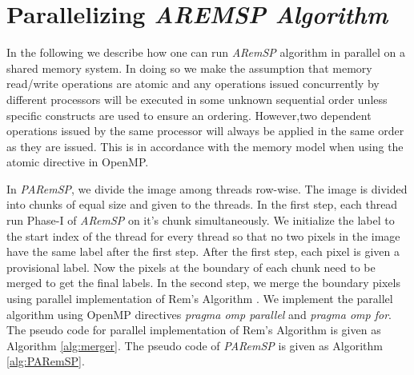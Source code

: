 \section{Parallelizing \em{AREMSP} Algorithm}

In the following we describe how one can run {\em ARemSP} algorithm in parallel
on a shared memory system. In doing so we make the assumption that memory read/write operations are atomic and any operations issued concurrently by different processors will be executed in some unknown 
sequential order unless specific constructs are used to ensure an ordering. However,two dependent operations issued by the same processor
will always be applied in the same order as they are issued. This is in accordance with the memory model when using the atomic directive in OpenMP.

In {\em PARemSP}, we divide the image among threads row-wise. The image is
divided into chunks of equal size and given to the threads. In the first step,
each thread run Phase-I of {\em ARemSP} on it's chunk simultaneously. We
initialize the label to the start index of the thread for every thread so that no two pixels in the image have the same label after the first step. After the first step, each pixel is given a provisional label. Now the pixels at the boundary of each chunk need to be merged to get the final labels. In the second step, we merge the boundary pixels using parallel implementation of Rem's 
Algorithm \cite{Patwary2012_PARemSP}. We implement the parallel algorithm using
OpenMP directives {\em pragma omp parallel} and {\em pragma omp for}. The
pseudo code for parallel implementation of Rem's Algorithm is given as Algorithm
\ref{alg:merger}. The pseudo code of {\em PARemSP} is given as Algorithm
\ref{alg:PARemSP}.
